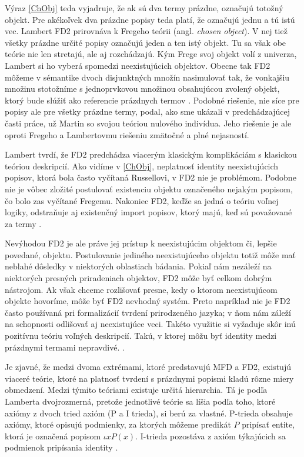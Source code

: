 \documentclass[12pt, letterpaper]{article}
\begin{document}
\noindent Výraz \ref{ChObj} teda vyjadruje, že ak sú dva termy prázdne, označujú totožný objekt. Pre akékoľvek dva prázdne popisy teda platí, že označujú jednu a tú istú vec.
Lambert FD2 prirovnáva k Fregeho teórii  (angl. \textit{chosen object}). V nej tiež všetky prázdne určité popisy označujú jeden a ten istý objekt. Tu sa však obe teórie nie len stretajú, ale aj rozchádzajú. Kým Frege svoj objekt volí z univerza, Lambert si ho vyberá spomedzi neexistujúcich objektov. Obecne tak FD2 môžeme v sémantike dvoch disjunktných množín nasimulovať tak, že vonkajšiu množinu stotožníme s jednoprvkovou množinou obsahujúcou zvolený objekt, ktorý bude slúžiť ako  referencie prázdnych termov \parencites[239--240]{LambertFraassen}[188]{LambertFDT}[70]{LambertHierarchy}[242]{Lehmann2002}[22--23]{Morscher2001}[1041--1042]{Nolt2007}[]{sep-logic-free}.
Podobné riešenie, nie síce pre popisy ale pre všetky prázdne termy, podal, ako sme ukázali v predchádzajúcej časti práce, už Martin so svojou teóriou nulového indivídua. Jeho riešenie je ale oproti Fregeho a Lambertovmu riešeniu zmätočné a plné nejasností.\par
Lambert tvrdí, že FD2 predchádza viacerým klasickým komplikáciám s klasickou teóriou deskripcií. Ako vidíme v \ref{ChObj}, neplatnosť identity neexistujúcich popisov, ktorá bola často vyčítaná Russellovi, v FD2 nie je problémom. Podobne nie je vôbec zložité postulovať existenciu objektu označeného nejakým popisom, čo bolo zas vyčítané Fregemu. Nakoniec FD2, keďže sa jedná o teóriu voľnej logiky, odstraňuje aj existenčný import popisov, ktorý majú, keď sú považované za termy \parencites[239--240]{LambertFraassen}.\par
Nevýhodou FD2 je ale práve jej prístup k neexistujúcim objektom či, lepšie povedané, objektu. Postulovanie jediného neexistujúceho objektu totiž môže mať neblahé dôsledky v niektorých oblastiach bádania. Pokiaľ nám nezáleží na niektorých presných priradeniach objektov, FD2 môže byť celkom dobrým nástrojom. Ak však chceme rozlišovať presne, kedy o ktorom neexistujúcom objekte hovoríme, môže byť FD2 nevhodný systém. Preto napríklad nie je FD2 často používaná pri formalizácií tvrdení prirodzeného jazyka; v ňom nám záleží na schopnosti odlišovať aj neexistujúce veci. Takéto využitie si vyžaduje skôr inú pozitívnu teóriu voľných deskripcií. Takú, v ktorej môžu byť identity medzi prázdnymi termami nepravdivé. \parencites[240]{LambertFraassen}[1042]{Nolt2007}.\par
Je zjavné, že medzi dvoma extrémami, ktoré predstavujú MFD a FD2, existujú viaceré teórie, ktoré na platnosť tvrdení s prázdnymi popismi kladú rôzne miery obmedzení. Medzi týmito teóriami existuje určitá hierarchia. Tá je podľa Lamberta dvojrozmerná, pretože jednotlivé teórie sa líšia podľa toho, ktoré axiómy z dvoch tried axióm (P a I trieda), si berú za vlastné. P-trieda obsahuje axiómy, ktoré opisujú podmienky, za ktorých môžeme predikát $P$ pripísať entite, ktorá je označená popisom $\iota x P(x)$. I-trieda pozostáva z axióm týkajúcich sa podmienok pripísania identity \parencites[89--91]{LambertHierarchy}.\par
\end{document}
